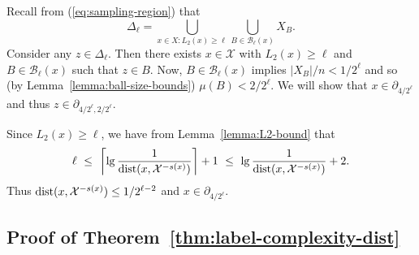 \documentclass{article}
\def\X{{\mathcal X}}
\def\B{{\mathcal B}}
\def\dist{{\rm dist}}
\begin{document}
Recall from (\ref{eq:sampling-region}) that
$$ \Delta_\ell = \bigcup_{x \in X: L_2(x) \geq \ell} \bigcup_{B \in \B_{\ell}(x)} X_B .$$
Consider any $z \in \Delta_\ell$. Then there exists $x \in \X$ with $L_2(x) \geq \ell$ and $B \in \B_\ell(x)$ such that $z \in B$. Now, $B \in \B_\ell(x)$ implies $|X_B|/n < 1/2^\ell$ and so (by Lemma~\ref{lemma:ball-size-bounds}) $\mu(B) < 2/2^\ell$. We will show that $x \in \partial_{4/2^\ell}$ and thus $z \in \partial_{4/2^\ell, 2/2^{\ell}}$.

Since $L_2(x) \geq \ell$, we have from Lemma~\ref{lemma:L2-bound} that
$$ \ell 
\ \leq \ \left\lceil \lg \frac{1}{\dist(x,\X^{-s(x)})} \right\rceil + 1 
\ \leq \ 
\lg \frac{1}{\dist(x,\X^{-s(x)})} + 2 .
$$
Thus $\dist(x, \X^{-s(x)}) \leq 1/2^{\ell-2}$ and $x \in \partial_{4/2^\ell}$.

\subsection{Proof of Theorem~\ref{thm:label-complexity-dist}}
\end{document}
